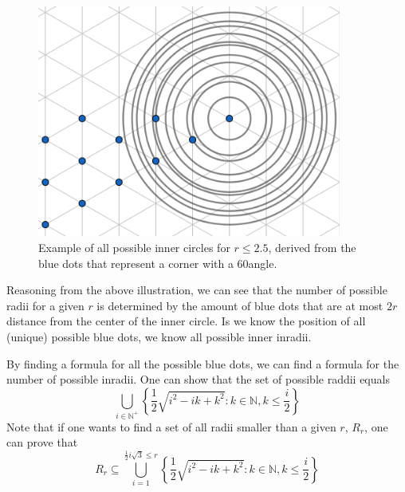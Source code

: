 \begin{figure}[ht]
    \centering
    \includegraphics[width=10cm]{challenges/assets/883/illustration_1.png}
    \caption{Example of all possible inner circles for \(r \leq 2.5\), derived from the blue dots that represent a corner with a 60\textdegree angle.}
\end{figure}

Reasoning from the above illustration, we can see that the number of possible radii for a given $r$ is determined by the amount of blue dots that are at most $2r$ distance from the center of the inner circle.
Is we know the position of all (unique) possible blue dots, we know all possible inner inradii.

By finding a formula for all the possible blue dots, we can find a formula for the number of possible inradii.
One can show that the set of possible raddii equals
\begin{equation*}
    \bigcup_{i\in\mathbb{N}^{+}} \left\{ \frac{1}{2}\sqrt{i^2 - ik+k^2} : k\in \mathbb{N}, k\leq\frac{i}{2}\right\}
\end{equation*}
Note that if one wants to find a set of all radii smaller than a given $r$, $R_r$, one can prove that
\begin{equation*}
    R_r \subseteq \bigcup_{i=1}^{\frac{1}{2}i\sqrt{3}\leq r} \left\{ \frac{1}{2}\sqrt{i^2 - ik+k^2} : k\in \mathbb{N}, k\leq\frac{i}{2}\right\}
\end{equation*}
